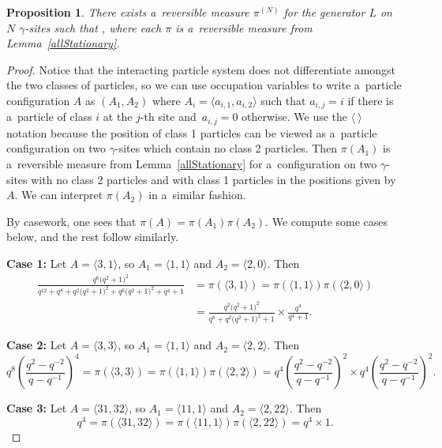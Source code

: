 \documentclass[pdftex]{sigma}
\numberwithin{equation}{section}
\newtheorem{Proposition}[Theorem]{Proposition}
\theoremstyle{definition}
\begin{document}
\begin{Proposition}
\label{generalizeStationary}
There exists a~reversible measure $\pi^{(N)}$ for the generator $L$ on $N$ $\gamma$-sites such that ,
where each $\pi$ is a~reversible measure from Lemma~{\rm\ref{allStationary}}.
\end{Proposition}

\begin{proof}\label{generalizeStationaryProof}
Notice that the interacting particle system does not differentiate amongst the two classes of particles, so we can use occupation variables to write a~particle configuration $A$ as $(A_1, A_2)$ where $A_i= \langle a_{i,1}, a_{i,2} \rangle$ such that $a_{i,j} = i$ if there is a~particle of class $i$ at the $j$-th site and~${a_{i,j}=0}$ otherwise. We use the $\langle ~\rangle$ notation because the position of class 1 particles can be viewed as a~particle configuration on two $\gamma$-sites which contain no class 2 particles. Then $\pi(A_1)$ is a~reversible measure from Lemma~\ref{allStationary} for a~configuration on two $\gamma$-sites with no class 2 particles and with class 1 particles in the positions given by $A$. We can interpret $\pi(A_2)$ in a~similar fashion.

By casework, one sees that $\pi(A) = \pi(A_1)\pi(A_2)$. We compute some cases below, and the rest follow similarly.

\textbf{Case 1:} Let $A = \langle 3,1 \rangle$, so $A_1 = \langle 1,1 \rangle$ and $A_2 = \langle 2,0 \rangle$. Then
\begin{align*}
 \frac{ q^6\bigl(q^2+1\bigr)^2}{q^{12} + q^8 + q^2\bigl(q^2+1\bigr)^2+q^6\bigl(q^2+1\bigr)^2+ q^4 +1} &= \pi(\langle 3,1 \rangle)= \pi(\langle 1,1 \rangle) \pi(\langle 2,0 \rangle) \\
 &= \frac{q^2\bigl(q^2+1\bigr)^2}{q^8 + q^2\bigl(q^2+1\bigr)^2 + 1} \times \frac{q^4}{q^4 + 1}.
\end{align*}

\textbf{Case 2:} Let $A = \langle 3,3 \rangle$, so $A_1 = \langle 1,1 \rangle$ and $A_2 = \langle 2,2\rangle$. Then
\[q^8 \left(\frac{q^2 - q^{-2}}{q-q^{-1}} \right)^4 = \pi(\langle 3,3 \rangle) = \pi(\langle 1,1 \rangle) \pi(\langle 2,2\rangle) = q^4\left(\frac{q^2 - q^{-2}}{q-q^{-1}} \right)^2 \times q^4\left(\frac{q^2 - q^{-2}}{q-q^{-1}} \right)^2.\]

\textbf{Case 3:} Let $A = \langle 31,32\rangle$, so $A_1 = \langle 11,1\rangle$ and $A_2 = \langle 2,22\rangle$. Then
\[q^4 = \pi(\langle 31,32\rangle) = \pi(\langle 11,1\rangle) \pi(\langle 2,22\rangle) = q^4 \times 1.\]


\end{proof}
\end{document}
